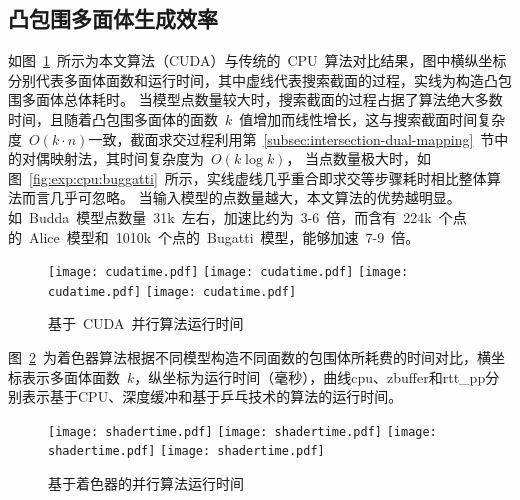\subsection{凸包围多面体生成效率}
\label{subsec:exper:efficiency}

如图~\ref{fig:chart:exps:cputime}~所示为本文算法（CUDA）与传统的~CPU~算法对比结果，图中横纵坐标分别代表多面体面数和运行时间，其中虚线代表搜索截面的过程，实线为构造凸包围多面体总体耗时。
当模型点数量较大时，搜索截面的过程占据了算法绝大多数时间，且随着凸包围多面体的面数~$k$~值增加而线性增长，这与搜索截面时间复杂度~$O(k\cdot
n)$一致，截面求交过程利用第~\ref{subsec:intersection-dual-mapping}~节中的对偶映射法，其时间复杂度为~$O(k\log k)$，
当点数量极大时，如图~\ref{fig:exp:cpu:buggatti}~所示，实线虚线几乎重合即求交等步骤耗时相比整体算法而言几乎可忽略。
当输入模型的点数量越大，本文算法的优势越明显。如~Budda~模型点数量~31k~左右，加速比约为~3-6~倍，而含有~224k~个点的~Alice~模型和~1010k~个点的~Bugatti~模型，能够加速~7-9~倍。

\begin{figure}[htbp] %
\centering
{}
{  
   \texttt{[image: cudatime.pdf]}
}
{  
    \texttt{[image: cudatime.pdf]}
}\linebreak %
{  
   \texttt{[image: cudatime.pdf]}
}
{  
   \texttt{[image: cudatime.pdf]}
}
\caption{基于~CUDA~并行算法运行时间}
\label{fig:chart:exps:cputime}
\end{figure}

图~\ref{fig:chart:exps:shadertime}~为着色器算法根据不同模型构造不同面数的包围体所耗费的时间对比，横坐标表示多面体面数~$k$，纵坐标为运行时间（毫秒），曲线cpu、zbuffer和rtt\_pp分别表示基于CPU、深度缓冲和基于乒乓技术的算法的运行时间。

\begin{figure}[htbp] %
\centering
{}
{  
   \texttt{[image: shadertime.pdf]}
}
{  
    \texttt{[image: shadertime.pdf]}
}\linebreak %
{  
   \texttt{[image: shadertime.pdf]}
}
{  
   \texttt{[image: shadertime.pdf]}
}
\caption{基于着色器的并行算法运行时间}
\label{fig:chart:exps:shadertime}
\end{figure}

